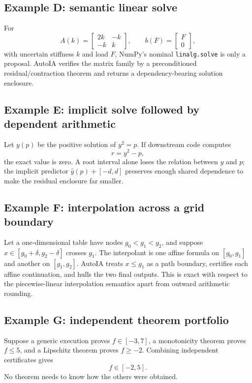 \documentclass[11pt]{article}
\begin{document}
\subsection{Example D: semantic linear solve}

For
\[
  A(k)=\begin{bmatrix}2k&-k\\-k&k\end{bmatrix},
  \qquad
  b(F)=\begin{bmatrix}F\\0\end{bmatrix},
\]
with uncertain stiffness \(k\) and load \(F\), NumPy's nominal
\texttt{linalg.solve} is only a proposal.  AutoIA verifies the matrix family by a
preconditioned residual/contraction theorem and returns a dependency-bearing
solution enclosure.

\subsection{Example E: implicit solve followed by dependent arithmetic}

Let \(y(p)\) be the positive solution of \(y^2=p\).  If downstream code computes
\[
  r=y^2-p,
\]
the exact value is zero.  A root interval alone loses the relation between \(y\)
and \(p\); the implicit predictor \(\widehat y(p)+[-d,d]\) preserves enough shared
dependence to make the residual enclosure far smaller.

\subsection{Example F: interpolation across a grid boundary}

Let a one-dimensional table have nodes \(g_0<g_1<g_2\), and suppose
\(x\in[g_0+\delta,g_2-\delta]\) crosses \(g_1\).  The interpolant is one affine
formula on \([g_0,g_1]\) and another on \([g_1,g_2]\).  AutoIA treats \(x\le g_1\)
as a path boundary, certifies each affine continuation, and hulls the two final
outputs.  This is exact with respect to the piecewise-linear interpolation
semantics apart from outward arithmetic rounding.

\subsection{Example G: independent theorem portfolio}

Suppose a generic execution proves \(f\in[-3,7]\), a monotonicity theorem proves
\(f\le5\), and a Lipschitz theorem proves \(f\ge-2\).  Combining independent
certificates gives
\[
  f\in[-2,5].
\]
No theorem needs to know how the others were obtained.
\end{document}
